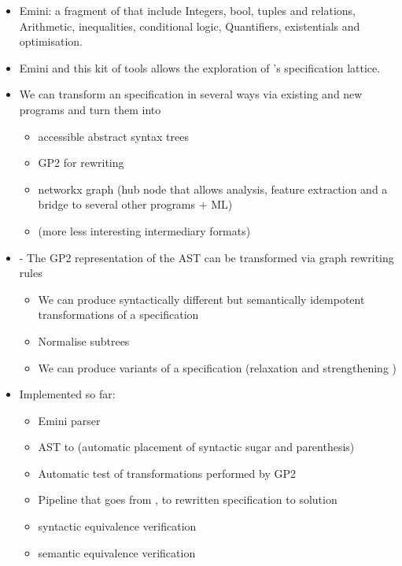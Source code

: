 \begin{itemize}
    \item Emini: a fragment of \essence that include Integers, bool, tuples and relations,
    Arithmetic, inequalities, conditional logic,
    Quantifiers, existentials and optimisation.
    \item Emini and this kit of tools allows the exploration of \essence's specification lattice.
    \item We can transform an \essence specification in several ways via existing and new programs and turn them into
    \begin{itemize}
        \item accessible abstract syntax trees
        \item GP2 for rewriting
        \item networkx graph (hub node that allows analysis, feature extraction and a bridge to several other programs + ML)
        \item (more less interesting intermediary formats)
        
    \end{itemize}
    \item -	The GP2 representation of the AST can be transformed via graph rewriting rules
    \begin{itemize}
        \item We can produce syntactically different but semantically idempotent transformations of a specification 
        \item Normalise subtrees
        \item We can produce variants of a specification (relaxation and strengthening )
        
    \end{itemize}
    \item Implemented so far:
    \begin{itemize}
        \item Emini parser
        \item AST to \essence (automatic placement of syntactic sugar and parenthesis)
        \item Automatic test of transformations performed by GP2
        \item Pipeline that goes from \essence, to rewritten specification to solution
        \item syntactic equivalence verification
        \item semantic equivalence verification
        
    \end{itemize}

\end{itemize}